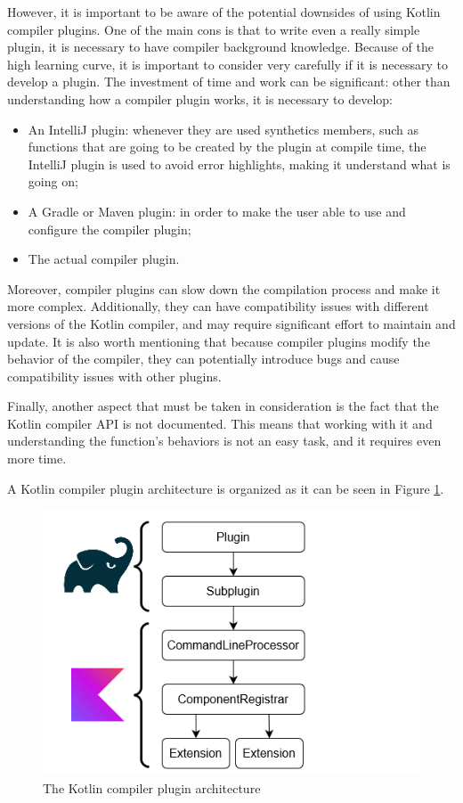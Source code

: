 However, it is important to be aware of the potential downsides of using Kotlin compiler plugins. One of the main cons is that to write even a really simple plugin, it is necessary to have compiler background knowledge. Because of the high learning curve, it is important to consider very carefully if it is necessary to develop a plugin. The investment of time and work can be significant: other than understanding how a compiler plugin works, it is necessary to develop:
\begin{itemize}
    \item An IntelliJ plugin: whenever they are used synthetics members, such as functions that are going to be created by the plugin at compile time, the IntelliJ plugin is used to avoid error highlights, making it understand what is going on;
    \item A Gradle or Maven plugin: in order to make the user able to use and configure the compiler plugin;
    \item The actual compiler plugin.
\end{itemize}

Moreover, compiler plugins can slow down the compilation process and make it more complex. Additionally, they can have compatibility issues with different versions of the Kotlin compiler, and may require significant effort to maintain and update. It is also worth mentioning that because compiler plugins modify the behavior of the compiler, they can potentially introduce bugs and cause compatibility issues with other plugins.

Finally, another aspect that must be taken in consideration is the fact that the Kotlin compiler API is not documented. This means that working with it and understanding the function's behaviors is not an easy task, and it requires even more time.

A Kotlin compiler plugin architecture is organized as it can be seen in Figure \ref{fig:kotlin_compiler_plugin_architecture}.

\begin{figure}[!ht]
    \centering
    \includegraphics[scale=0.8]{document/chapters/2-metaprogramming/images/kotlin_compiler_plugin_architecture.png}
    \caption{The Kotlin compiler plugin architecture \cite{compiler_plugins_jetbrains}}
    \label{fig:kotlin_compiler_plugin_architecture}
\end{figure}


